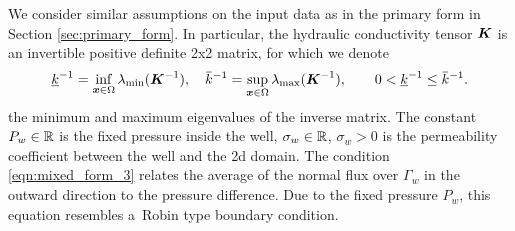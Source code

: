 We consider similar assumptions on the input data as in the primary form in Section \ref{sec:primary_form}.
In particular, the hydraulic conductivity tensor $\mathbf{\boldsymbol{K}}$ is an invertible
positive definite 2x2 matrix, for which we denote
\begin{equation}
    \underline{k}^{-1} = \inf\limits_{\bx\in\Omega}\lambda_{\min}(\vc K^{-1}), \quad
    \overbar{k}^{-1}   = \sup\limits_{\bx\in\Omega}\lambda_{\max}(\vc K^{-1}), \qquad
     0 < \underline{k}^{-1} \leq \overbar{k}^{-1}.
\end{equation}
the minimum and maximum eigenvalues of the inverse matrix.
The constant $P_w\in\mathbb{R}$ is the fixed pressure inside the well, $\sigma_w\in\mathbb{R}$, $\sigma_w>0$ is the
permeability coefficient between the well and the 2d domain.
The condition \eqref{eqn:mixed_form_3} relates the average of the normal flux over $\Gamma_w$ in the outward direction
to the pressure difference. Due to the fixed pressure $P_w$, this equation resembles a~Robin type boundary condition.

